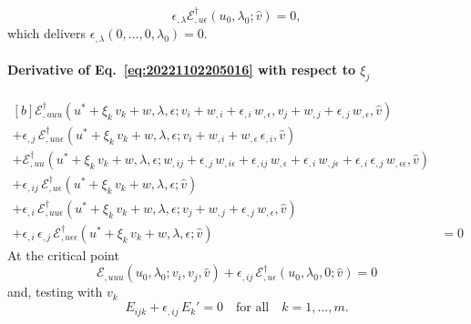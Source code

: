 \documentclass[12pt, final]{scrartcl}
\theoremstyle{definition}
\newcommand{\E}{\mathcal E}
\newcommand{\EE}{\mathcal E ^ \dagger}
\begin{document}
\begin{equation}
  \epsilon_{,\lambda} \EE_{,u\epsilon}(u_0, \lambda_0; \hat{v}) = 0,
\end{equation}
which delivers \(\epsilon_{,\lambda}(0, \ldots, 0, \lambda_0) = 0\).

\paragraph{Derivative of Eq.~\eqref{eq:20221102205016} with respect to \(\xi_j\)}
\begin{equation}
  \label{eq:20221109062643}
  \begin{aligned}[b]
    \EE_{,uuu}(u^\ast + \xi_k \, v_k + w, \lambda, \epsilon; v_i + w_{,i} + \epsilon_{,i} \,  w_{,\epsilon}, v_j + w_{,j} + \epsilon_{,j} \, w_{,\epsilon}, \hat{v})&\\
    + \epsilon_{,j} \, \EE_{,uu\epsilon}(u^\ast + \xi_k \, v_k + w, \lambda, \epsilon; v_i + w_{,i} + w_{,\epsilon} \, \epsilon_{,i}, \hat{v})&\\
    + \EE_{,uu}(u^\ast + \xi_k \, v_k + w, \lambda, \epsilon; w_{,ij} + \epsilon_{,j} \, w_{,i\epsilon} + \epsilon_{,ij} \, w_{,\epsilon} + \epsilon_{,i} \, w_{,j\epsilon} + \epsilon_{,i} \, \epsilon_{,j} \, w_{,\epsilon\epsilon} , \hat{v})&\\
    + \epsilon_{,ij} \, \EE_{,u\epsilon}(u^\ast + \xi_k \, v_k + w, \lambda, \epsilon; \hat{v})&\\
    + \epsilon_{,i} \, \EE_{,uu\epsilon}(u^\ast + \xi_k \, v_k + w, \lambda, \epsilon; v_j + w_{,j} + \epsilon_{,j} \, w_{,\epsilon}, \hat{v})&\\
    + \epsilon_{,i} \, \epsilon_{,j} \, \EE_{,u\epsilon\epsilon}(u^\ast + \xi_k \, v_k + w, \lambda, \epsilon; \hat{v}) &= 0
  \end{aligned}
\end{equation}
At the critical point
\begin{equation}
  \E_{,uuu}(u_0, \lambda_0; v_i, v_j, \hat{v}) + \epsilon_{,ij} \, \EE_{,u\epsilon}(u_0, \lambda_0, 0; \hat{v}) = 0
\end{equation}
and, testing with \(v_k\)
\begin{equation}
  E_{ijk} + \epsilon_{,ij} \, E_k' = 0 \quad \text{for all} \quad k = 1, \ldots, m.
\end{equation}
\end{document}
